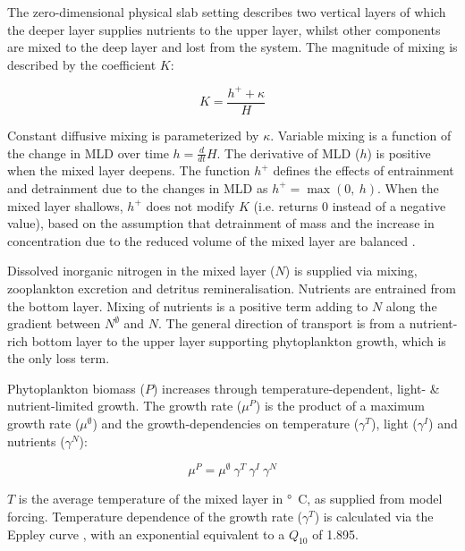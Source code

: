 \documentclass[journal abbreviation, manuscript]{copernicus}
\begin{document}
The zero-dimensional physical slab setting describes two vertical layers of which the deeper layer supplies nutrients to the upper layer, whilst other components are mixed to the deep layer and lost from the system.
The magnitude of mixing is described by the coefficient $K$:

\begin{equation}
    K = \frac{h^{+} + \kappa}{H}
\end{equation}

Constant diffusive mixing is parameterized by $\kappa$. Variable mixing is a function of the change in MLD over time $h = \frac{d}{d t} H$. The derivative of MLD ($h$) is positive when the mixed layer deepens. The function $h^{+}$ defines the effects of entrainment and detrainment due to the changes in MLD as $h^{+} = \max(0, \ h)$. When the mixed layer shallows, $h^{+}$ does not modify $K$ (i.e. returns 0 instead of a negative value), based on the assumption that detrainment of mass and the increase in concentration due to the reduced volume of the mixed layer are balanced \citep{Evans1985ACycles}. 

Dissolved inorganic nitrogen in the mixed layer ($N$) is supplied via mixing, zooplankton excretion and detritus remineralisation.
Nutrients are entrained from the bottom layer. Mixing of nutrients is a positive term adding to $N$ along the gradient between $N^\emptyset$ and $N$. The general direction of transport is from a nutrient-rich bottom layer to the upper layer supporting phytoplankton growth, which is the only loss term.

Phytoplankton biomass ($P$) increases through temperature-dependent, light- \& nutrient-limited growth. The growth rate ($\mu^{P}$) is the product of a maximum growth rate ($\mu^{\emptyset}$) and the growth-dependencies on temperature ($\gamma^{T}$), light ($\gamma^{I}$) and nutrients ($\gamma^{N}$): 

\begin{equation}
    \mu^{P} = \mu^{\emptyset} \ \gamma^{T} \ \gamma^{I} \ \gamma^{N}
\end{equation}

$T$ is the average temperature of the mixed layer in \unit{\degree C}, as supplied from model forcing. Temperature dependence of the growth rate ($\gamma^{T}$) is calculated via the Eppley curve \citep{Eppley1972TemperatureSea}, with an exponential equivalent to a $Q_{10}$ of 1.895.
\end{document}
